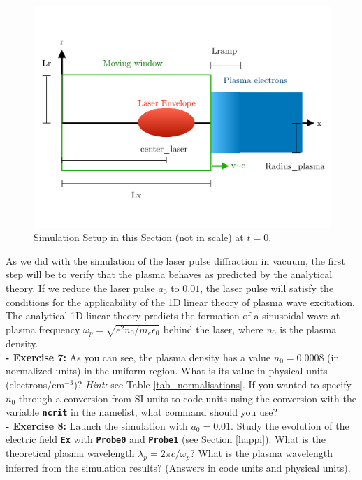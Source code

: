 \documentclass{article}
\newcommand{\commandline}[1]{\texttt{\textbf{#1}}}
\begin{document}
\begin{figure}[h!]
  \begin{center}
  \includegraphics[scale=0.3]{Schema_Simulation_2.pdf}
  \end{center}
  \caption{Simulation Setup in this Section (not in scale) at $t=0$.}
  \label{Schema2}
\end{figure}

As we did with the simulation of the laser pulse diffraction in vacuum,  the first step will be to verify that the plasma behaves as predicted by the analytical theory. If we reduce the laser pulse $a_0$ to $0.01$, the laser pulse will satisfy the conditions for the applicability of the 1D linear theory of plasma wave excitation. The  analytical 1D linear theory predicts the formation of a sinusoidal wave at plasma frequency $\omega_p=\sqrt{e^2n_0/m_e\epsilon_0}$ behind the laser, where $n_0$ is the plasma density.\\

\textbf{ - Exercise 7:} As you can see, the plasma density has a value $n_0=0.0008$ (in normalized units) in the uniform region.  What is its value in physical units (electrons/cm$^{-3}$)? \textit{Hint:} see Table \ref{tab_normalisations}. If you wanted to specify $n_0$ through a conversion from SI units to code units using the conversion with the variable \commandline{ncrit} in the namelist, what command should you use? \\

\textbf{ - Exercise 8:} Launch the simulation with $a_0=0.01$. Study the evolution of the electric field \commandline{Ex} with \commandline{Probe0} and \commandline{Probe1} (see Section \ref{happi}). What is the theoretical plasma wavelength $\lambda_p=2\pi c/\omega_p$? What is the plasma wavelength inferred from the simulation results? (Answers in code units and physical units).\\
\end{document}
